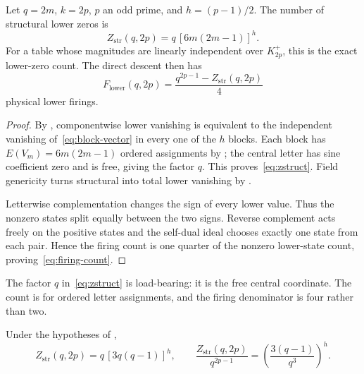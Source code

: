 \begin{theorem}
\label{thm:twice-prime-structural}
Let $q=2m$, $k=2p$, $p$ an odd prime, and $h=(p-1)/2$.  The number of
structural lower zeros is
\begin{equation}
  Z_{\mathrm{str}}(q,2p)=q\,[6m(2m-1)]^h.                                \label{eq:zstruct}
\end{equation}
For a table whose magnitudes are linearly independent over $K_{2p}^+$, this
is the exact lower-zero count.  The direct descent then has
\begin{equation}
  F_{\mathrm{lower}}(q,2p)
  =\frac{q^{2p-1}-Z_{\mathrm{str}}(q,2p)}4                               \label{eq:firing-count}
\end{equation}
physical lower firings.
\end{theorem}

\begin{proof}
By , componentwise lower vanishing is equivalent to
the independent vanishing of~\eqref{eq:block-vector} in every one of the $h$
blocks.  Each block has $E(V_m)=6m(2m-1)$ ordered assignments by
; the central letter has sine coefficient zero and is
free, giving the factor $q$.  This proves~\eqref{eq:zstruct}.  Field
genericity turns structural into total lower vanishing by
.

Letterwise complementation changes the sign of every lower value.  Thus the
nonzero states split equally between the two signs.  Reverse complement
acts freely on the positive states and the self-dual ideal chooses exactly
one state from each pair.  Hence the firing count is one quarter of the
nonzero lower-state count, proving~\eqref{eq:firing-count}.
\end{proof}

The factor $q$ in~\eqref{eq:zstruct} is load-bearing: it is the free central
coordinate.  The count is for ordered letter assignments, and the firing
denominator is four rather than two.

\begin{corollary}
\label{cor:structural-zero-density}
Under the hypotheses of ,
\begin{equation}
  Z_{\mathrm{str}}(q,2p)=q\,[3q(q-1)]^h,
  \qquad
  \frac{Z_{\mathrm{str}}(q,2p)}{q^{2p-1}}
  =\left(\frac{3(q-1)}{q^3}\right)^h .                                  \label{eq:structural-density}
\end{equation}
\end{corollary}

